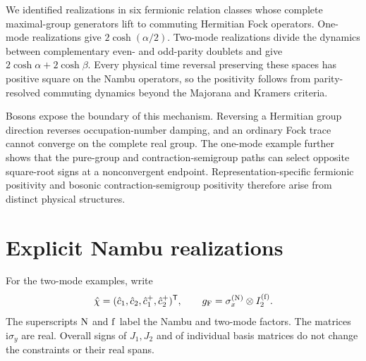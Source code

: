 \documentclass[onecolumn,aps,prb,amsmath,amssymb,superscriptaddress,longbibliography]{revtex4-2}
\newcommand{\ii}{\mathrm{i}}
\newcommand{\trans}{\mathsf{T}}
\begin{document}
We identified realizations in six fermionic relation classes whose complete
maximal-group generators lift to commuting Hermitian Fock operators.  One-mode
realizations give \(2\cosh(\alpha/2)\).  Two-mode realizations divide the
dynamics between complementary even- and odd-parity doublets and give
\(2\cosh\alpha+2\cosh\beta\).  Every physical time reversal preserving these
spaces has positive square on the Nambu operators, so the positivity follows from
parity-resolved commuting dynamics beyond the Majorana and Kramers criteria.

Bosons expose the boundary of this mechanism.  Reversing a Hermitian group
direction reverses occupation-number damping, and an ordinary Fock trace
cannot converge on the complete real group.  The one-mode example further
shows that the pure-group and contraction-semigroup paths can select opposite
square-root signs at a nonconvergent endpoint.  Representation-specific
fermionic positivity and bosonic contraction-semigroup positivity therefore
arise from distinct physical structures.

\appendix

\section{Explicit Nambu realizations}
\label{app:explicit_matrices}

For the two-mode examples, write
\begin{equation}
    \hat\chi=(\hat c_1,\hat c_2,\hat c_1^+,\hat c_2^+)^\trans,
    \qquad
    g_{\rm F}=\sigma_x^{({\rm N})}\otimes I_2^{({\rm f})}.
    \label{eq:two_mode_nambu}
\end{equation}
The superscripts \({\rm N}\) and \({\rm f}\) label the Nambu and two-mode
factors.  The matrices \(\ii\sigma_y\) are real.  Overall signs of \(J_1,J_2\)
and of individual basis matrices do not change the constraints or their real
spans.
\end{document}
